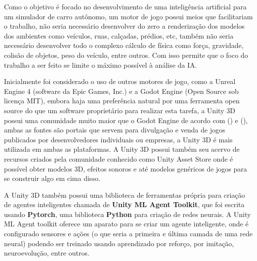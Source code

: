 
Como o objetivo é focado no desenvolvimento de uma inteligência artificial para um simulador de carro autônomo, um motor de jogo possui meios que facilitariam o trabalho, não seria necessário desenvolver do zero a renderização dos modelos dos ambientes como veículos, ruas, calçadas, prédios, etc, também não seria necessário desenvolver todo o complexo cálculo de física como força, gravidade, colisão de objetos, peso do veículo, entre outros. Com isso permite que o foco do trabalho a ser feito se limite o máximo possível à análise da IA.

Inicialmente foi considerado o uso de outros motores de jogo, como a Unreal Engine 4 (software da Epic Games, Inc.) e a Godot Engine (Open Source sob licença MIT), embora haja uma preferência natural por uma ferramenta open source do que um software proprietário para realizar esta tarefa, a Unity 3D possui uma comunidade muito maior que o Godot Engine de acordo com () e (), ambas as fontes são portais que servem para divulgação e venda de jogos publicados por desenvolvedores individuais ou empresas, a Unity 3D é mais utilizada em ambas as plataformas. A Unity 3D possui também seu acervo de recursos criados pela comunidade conhecido como Unity Asset Store onde é possível obter modelos 3D, efeitos sonoros e até modelos genéricos de jogos para se construir algo em cima disso. 

A Unity 3D também possui uma biblioteca de ferramentas própria para criação de agentes inteligentes chamada de \textbf{Unity ML Agent Toolkit}, que foi escrita usando \textbf{Pytorch}, uma biblioteca \textbf{Python} para criação de redes neurais. A Unity ML Agent toolkit oferece um aparato para se criar um agente inteligente, onde é configurado sensores e ações (o que seria a primeira e última camada de uma rede neural) podendo ser treinado usando aprendizado por reforço, por imitação, neuroevolução, entre outros.

